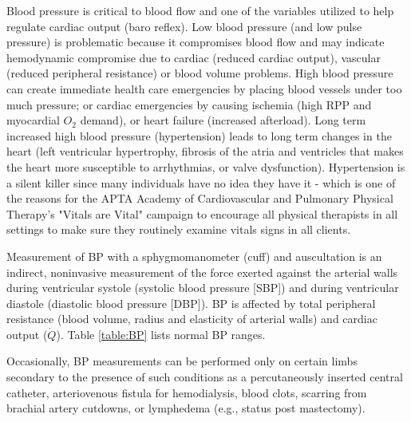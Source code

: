 Blood pressure is critical to blood flow and one of the variables utilized to help regulate cardiac output (baro reflex). Low blood pressure (and low pulse pressure) is problematic because it compromises blood flow and may indicate hemodynamic compromise due to cardiac (reduced cardiac output), vascular (reduced peripheral resistance) or blood volume problems. High blood pressure can create immediate health care emergencies by placing blood vessels under too much pressure; or cardiac emergencies by causing ischemia (high RPP and myocardial $O_2$ demand), or heart failure (increased afterload). Long term increased high blood pressure (hypertension) leads to long term changes in the heart (left ventricular hypertrophy, fibrosis of the atria and ventricles that makes the heart more susceptible to arrhythmias, or valve dysfunction). Hypertension is a silent killer since many individuals have no idea they have it - which is one of the reasons for the APTA Academy of Cardiovascular and Pulmonary Physical Therapy's "Vitals are Vital" campaign to encourage all physical therapists in all settings to make sure they routinely examine vitals signs in all clients.

Measurement of BP with a sphygmomanometer (cuff) and auscultation is an indirect, noninvasive measurement of the force exerted against the arterial walls during ventricular systole (systolic blood pressure [SBP]) and during ventricular diastole (diastolic blood pressure [DBP]). BP is affected by total peripheral resistance (blood volume, radius and elasticity of arterial walls) and cardiac output ($\dot{Q}$). Table \ref{table:BP} lists normal BP ranges. 

Occasionally, BP measurements can be performed only on certain limbs secondary to the presence of such conditions as a percutaneously inserted central catheter, arteriovenous fistula for hemodialysis, blood clots, scarring from brachial artery cutdowns, or lymphedema (e.g., status post mastectomy). 

